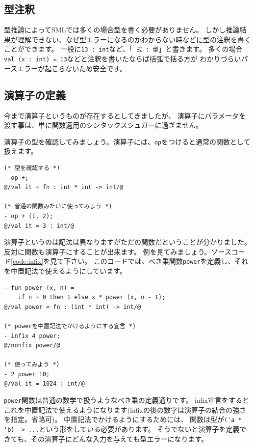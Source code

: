 \documentclass[11pt,a4paper]{article}
\begin{document}
\subsection{型注釈}

型推論によってSMLでは多くの場合型を書く必要がありません。
しかし推論結果が理解できない、なぜ型エラーになるのかわからない時などに型の注釈を書くことができます。
一般に\lstinline{13 : int}など、「\lstinline{ 式 : 型}」と書きます。
多くの場合\lstinline{val (x : int) = 13}などと注釈を書いたならば括弧で括る方が
わかりづらいパースエラーが起こらないため安全です。

\subsection{演算子の定義}
今まで演算子というものが存在するとしてきましたが、
演算子にパラメータを渡す事は、単に関数適用のシンタックスシュガーに過ぎません。

演算子の型を確認してみましょう。演算子には、\lstinline{op}をつけると通常の関数として扱えます。
\begin{lstlisting}[caption=演算子を評価する]
(* 型を確認する *)
- op +;
@/val it = fn : int * int -> int/@

(* 普通の関数みたいに使ってみよう *)
- op + (1, 2);
@/val it = 3 : int/@
\end{lstlisting}

演算子というのは記法は異なりますがただの関数だということが分かりました。
反対に関数も演算子にすることが出来ます。
例を見てみましょう。ソースコード\ref{code:infix}を見て下さい。
このコードでは、べき乗関数\lstinline{power}を定義し、それを中置記法で使えるようにしています。

\begin{lstlisting}[caption=演算子の定義,label=code:infix]
- fun power (x, n) =
    if n = 0 then 1 else x * power (x, n - 1);
@/val power = fn : (int * int) -> int/@

(* powerを中置記法でかけるようにする宣言 *)
- infix 4 power;
@/nonfix power/@

(* 使ってみよう *)
- 2 power 10;
@/val it = 1024 : int/@
\end{lstlisting}

\lstinline{power}関数は普通の数学で扱うようなべき乗の定義通りです。
infix宣言をするとこれを中置記法で使えるようになります(infixの後の数字は演算子の結合の強さを指定。省略可)。
中置記法でかけるようにするためには、
関数は型が\lstinline{('a * 'b) -> ...}という形をしている必要があります。
そうでないと演算子を定義できても、その演算子にどんな入力を与えても型エラーになります。
\end{document}
